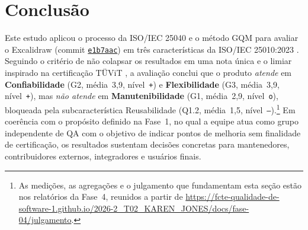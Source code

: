 \documentclass[12pt]{article}
\newcommand{\commitref}{\href{https://github.com/excalidraw/excalidraw/commit/e1b7aacb356a492aa1e0fc6eb57b8896124027f0}{\texttt{e1b7aac}}}
\begin{document}
\section{Conclusão}
\label{sec:conclusao}

Este estudo aplicou o processo da ISO/IEC 25040 \cite{iso25040} e o método GQM \cite{basili1994gqm} para avaliar o Excalidraw (commit \commitref) em três características da ISO/IEC 25010:2023 \cite{iso25010}. Seguindo o critério de não colapsar os resultados em uma nota única \cite{heitlager2007} e o limiar inspirado na certificação TÜViT \cite{baggen2010}, a avaliação conclui que o produto \textit{atende} em \textbf{Confiabilidade} (G2, média~3,9, nível~\texttt{+}) e \textbf{Flexibilidade} (G3, média~3,9, nível~\texttt{+}), mas \textit{não atende} em \textbf{Manutenibilidade} (G1, média~2,9, nível~\texttt{o}), bloqueada pela subcaracterística Reusabilidade (Q1.2, média~1,5, nível~\texttt{--}).\footnote{As medições, as agregações e o julgamento que fundamentam esta seção estão nos relatórios da Fase~4, reunidos a partir de \url{https://fcte-qualidade-de-software-1.github.io/2026-2_T02_KAREN_JONES/docs/fase-04/julgamento}.} Em coerência com o propósito definido na Fase~1, no qual a equipe atua como grupo independente de QA com o objetivo de indicar pontos de melhoria sem finalidade de certificação, os resultados sustentam decisões concretas para mantenedores, contribuidores externos, integradores e usuários finais.
\end{document}
